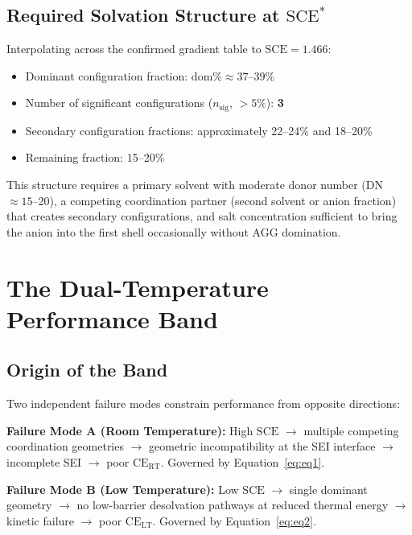 \documentclass[12pt,letterpaper]{article}
\newcommand{\mSCE}{\mathrm{SCE}}
\newcommand{\mSCEstar}{\mathrm{SCE}^{*}}
\begin{document}
\subsection{Required Solvation Structure at $\mSCEstar$}
\label{sec:structure}

Interpolating across the confirmed gradient table to
$\mSCE = 1.466$:

\begin{itemize}
  \item Dominant configuration fraction:
        $\mathrm{dom\%} \approx 37$--$39\%$
  \item Number of significant configurations
        ($n_{\mathrm{sig}}$, $> 5\%$): \textbf{3}
  \item Secondary configuration fractions:
        approximately 22--24\% and 18--20\%
  \item Remaining fraction: 15--20\%
\end{itemize}

This structure requires a primary solvent with moderate
donor number (DN $\approx 15$--20), a competing
coordination partner (second solvent or anion fraction)
that creates secondary configurations, and salt
concentration sufficient to bring the anion into the
first shell occasionally without AGG domination.

\section{The Dual-Temperature Performance Band}
\label{sec:band}

\subsection{Origin of the Band}
\label{sec:bandorigin}

Two independent failure modes constrain performance from
opposite directions:

\textbf{Failure Mode A (Room Temperature):}
High $\mSCE$ $\rightarrow$ multiple competing
coordination geometries $\rightarrow$ geometric
incompatibility at the SEI interface $\rightarrow$
incomplete SEI $\rightarrow$ poor
$\mathrm{CE}_{\mathrm{RT}}$.
Governed by Equation~\ref{eq:eq1}.

\textbf{Failure Mode B (Low Temperature):}
Low $\mSCE$ $\rightarrow$ single dominant geometry
$\rightarrow$ no low-barrier desolvation pathways
at reduced thermal energy $\rightarrow$ kinetic failure
$\rightarrow$ poor $\mathrm{CE}_{\mathrm{LT}}$.
Governed by Equation~\ref{eq:eq2}.
\end{document}
